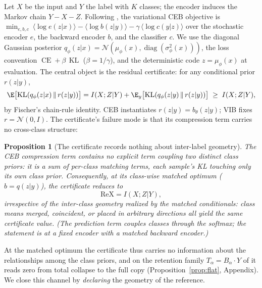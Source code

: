 \documentclass{article} %
\theoremstyle{plain}
\newtheorem{proposition}{Proposition}[section]
\theoremstyle{remark}
\renewcommand{\KL}{\operatorname{KL}}
\DeclareMathOperator{\CE}{CE}
\begin{document}
Let $X$ be the input and $Y$ the label with $K$ classes; the encoder induces the Markov
chain $Y - X - Z$. Following \citet{fischer2020conditional}, the variational CEB
objective is $\min_{e,b,c}\ \langle \log e(z|x)\rangle - \langle \log b(z|y)\rangle
- \gamma\,\langle \log c(y|z)\rangle$ over the stochastic encoder $e$, the backward
encoder $b$, and the classifier $c$. We use the diagonal Gaussian posterior
$q_\phi(z|x) = \mathcal{N}(\mu_\phi(x), \operatorname{diag}(\sigma_\phi^2(x)))$, the
loss convention $\CE + \beta\,\KL$ ($\beta = 1/\gamma$), and the deterministic code
$z = \mu_\phi(x)$ at evaluation. The central object is the residual certificate: for
any conditional prior $r(z|y)$,
\begin{equation}
\E\bigl[\KL(q_\phi(z|x)\,\|\,r(z|y))\bigr]
= I(X;Z|Y) + \E_y\bigl[\KL(q_\phi(z|y)\,\|\,r(z|y))\bigr]
\;\ge\; I(X;Z|Y) ,
\label{eq:gap}
\end{equation}
by Fischer's chain-rule identity. CEB instantiates $r(z|y) = b_\theta(z|y)$; VIB fixes
$r = \mathcal{N}(0,I)$. The certificate's failure mode is that its compression term
carries no cross-class structure:

\begin{proposition}[The certificate records nothing about inter-label geometry]
\label{prop:geom-blind}
The CEB compression term contains no explicit term coupling two distinct class priors:
it is a sum of per-class matching terms, each sample's KL touching only its own class
prior. Consequently, at its class-wise matched optimum ($b = q(z|y)$), the certificate
reduces to
\begin{equation}
\mathrm{ReX} = I(X;Z|Y) ,
\label{eq:reix-residual}
\end{equation}
irrespective of the inter-class geometry realized by the matched conditionals: class
means merged, coincident, or placed in arbitrary directions all yield the same
certificate value. (The prediction term couples classes through the softmax; the
statement is at a fixed encoder with a matched backward encoder.)
\end{proposition}

At the matched optimum the certificate thus carries no information about the
relationships among the class priors, and on the retention family
$T_\alpha = B_\alpha\cdot Y$ of \citet{kolchinsky2019caveats} it reads zero from total
collapse to the full copy (Proposition~\ref{prop:flat}, Appendix). We close this
channel by \emph{declaring} the geometry of the reference.
\end{document}
